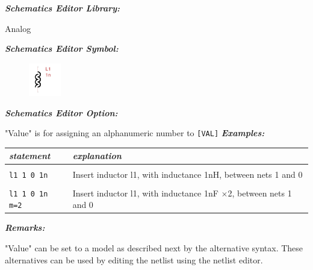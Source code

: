\textbf{\textit{Schematics Editor Library:}}

Analog

\textbf{\textit{Schematics Editor Symbol:}}

\begin{figure}[htb]
  \begin{center}
    \includegraphics[width=0.125\textwidth]{./pics/SpiceEl/Inductor.png}
  \end{center}
\end{figure}

\textbf{\textit{Schematics Editor Option:}}

"\textsf{Value}" is for assigning an alphanumeric number to \texttt{[VAL]}
\newpage
\textbf{\textit{Examples:}}

\begin{longtable}{l l}
\textit{statement} & \textit{explanation} \\ \hline \\ \vspace{-0.8\parskip} 
\begin{minipage}{15em}\texttt{l1 1 0 1n}\end{minipage} & 
\begin{minipage}{15em}{\small Insert inductor l1, with inductance 1nH, between nets 1 and 0}\end{minipage} \\ \\
\begin{minipage}{15em}\texttt{l1 1 0 1n m=2}\end{minipage} & 
\begin{minipage}{15em}{\small Insert inductor l1, with inductance 1nF $\times$2, between nets 1 and 0}\end{minipage}
\end{longtable}

\textbf{\textit{Remarks:}}

"\textsf{Value}" can be set to a model as described next by the alternative syntax. These alternatives can be used by editing the netlist using the netlist editor.



